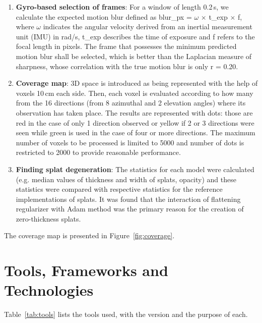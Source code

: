 \begin{enumerate}
    \item \textbf{Gyro-based selection of frames}: For a window of length 0.2\,s, we calculate the expected motion blur defined as blur\_px = $\omega$ $\times$ t\_exp $\times$ f, where $\omega$ indicates the angular velocity derived from an inertial measurement unit (IMU) in rad/s, t\_exp describes the time of exposure and f refers to the focal length in pixels. The frame that possesses the minimum predicted motion blur shall be selected, which is better than the Laplacian measure of sharpness, whose correlation with the true motion blur is only r = 0.20.

    \item \textbf{Coverage map}: 3D space is introduced as being represented with the help of voxels 10\,cm each side. Then, each voxel is evaluated according to how many from the 16 directions (from 8 azimuthal and 2 elevation angles) where its observation has taken place. The results are represented with dots: those are red in the case of only 1 direction observed or yellow if 2 or 3 directions were seen while green is used in the case of four or more directions. The maximum number of voxels to be processed is limited to 5000 and number of dots is restricted to 2000 to provide reasonable performance.

    \item \textbf{Finding splat degeneration}: The statistics for each model were calculated (e.g. median values of thickness and width of splats, opacity) and these statistics were compared with respective statistics for the reference implementations of splats. It was found that the interaction of flattening regularizer with Adam method was the primary reason for the creation of zero-thickness splats.
\end{enumerate}

The coverage map is presented in Figure~\ref{fig:coverage}.

\section{Tools, Frameworks and Technologies}

Table~\ref{tab:tools} lists the tools used, with the version and the purpose of each.

